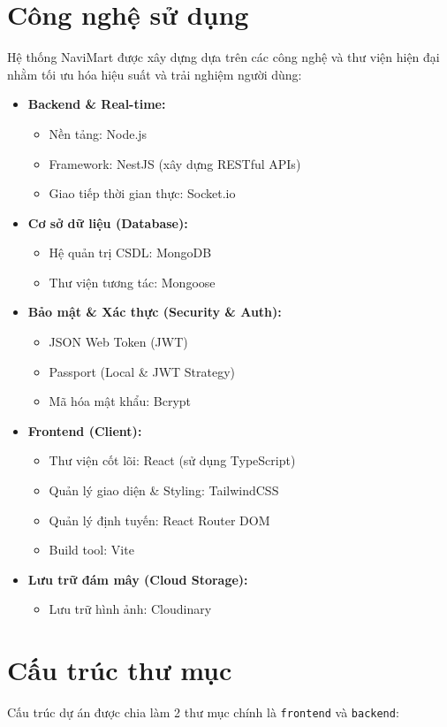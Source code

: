 \documentclass[../main.tex]{subfiles}
\begin{document}
\section{Công nghệ sử dụng}
Hệ thống NaviMart được xây dựng dựa trên các công nghệ và thư viện hiện đại nhằm tối ưu hóa hiệu suất và trải nghiệm người dùng:
\begin{itemize}
    \item \textbf{Backend \& Real-time:}
    \begin{itemize}
        \item Nền tảng: Node.js
        \item Framework: NestJS (xây dựng RESTful APIs)
        \item Giao tiếp thời gian thực: Socket.io
    \end{itemize}
    \item \textbf{Cơ sở dữ liệu (Database):}
    \begin{itemize}
        \item Hệ quản trị CSDL: MongoDB
        \item Thư viện tương tác: Mongoose
    \end{itemize}
    \item \textbf{Bảo mật \& Xác thực (Security \& Auth):}
    \begin{itemize}
        \item JSON Web Token (JWT)
        \item Passport (Local \& JWT Strategy)
        \item Mã hóa mật khẩu: Bcrypt
    \end{itemize}
    \item \textbf{Frontend (Client):}
    \begin{itemize}
        \item Thư viện cốt lõi: React (sử dụng TypeScript)
        \item Quản lý giao diện \& Styling: TailwindCSS
        \item Quản lý định tuyến: React Router DOM
        \item Build tool: Vite
    \end{itemize}
    \item \textbf{Lưu trữ đám mây (Cloud Storage):}
    \begin{itemize}
        \item Lưu trữ hình ảnh: Cloudinary
    \end{itemize}
\end{itemize}

\section{Cấu trúc thư mục}
Cấu trúc dự án được chia làm 2 thư mục chính là \texttt{frontend} và \texttt{backend}:
\end{document}

